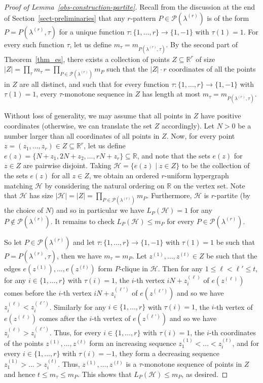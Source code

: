 \documentclass[10pt,a4paper]{amsart}
\theoremstyle{definition}
\newcommand{\su}{\subseteq}
\newcommand{\HH}{\mathcal{H}}
\newcommand{\PP}{\mathcal{P}}
\begin{document}
\begin{proof}[Proof of Lemma~\ref{obs-construction-partite}]
    Recall from the discussion at the end of Section~\ref{sect-preliminaries} that any $r$-pattern $P\in \PP(\lambda^{(r)})$ is of the form $P=P(\lambda^{(r)},\tau)$ for a unique function $\tau:\{1,\dots,r\}\to \{1,-1\}$ with $\tau(1)=1$. For every such function $\tau$, let us define $m_\tau=m_{P(\lambda^{(r)},\tau)}$. By the second part of Theorem~\ref{thm_es}, there exists a collection of points $Z\su \mathbb{R}^r$ of size $|Z|=\prod_{\tau} m_{\tau}=\prod_{P\in \PP(\lambda^{(r)})} m_{P}$ such that the $|Z|\cdot r$ coordinates of all the points in $Z$ are all distinct, and such that for every function $\tau:\{1,\dots,r\}\to \{1,-1\}$ with $\tau(1)=1$, every $\tau$-monotone sequence in $Z$ has length at most $m_\tau=m_{P(\lambda^{(r)},\tau)}$.
    
    Without loss of generality, we may assume that all points in $Z$ have positive coordinates (otherwise, we can translate the set $Z$ accordingly). Let $N>0$ be a number larger than all coordinates of all points in $Z$. Now, for every point $z=(z_1,\dots,z_r)\in Z\su \mathbb{R}^r$, let us define $e(z)=\{N+ z_1, 2N + z_2, \ldots, r N+z_r \}\su \mathbb{R}$, and note that the sets $e(z)$ for $z\in Z$ are pairwise disjoint. Taking $\HH=\{e(z)\mid z\in Z\}$ to be the collection of the sets $e(z)$ for all $z\in Z$, we obtain an ordered $r$-uniform hypergraph matching $\HH$ by considering the natural ordering on $\mathbb{R}$ on the vertex set. Note that $\HH$ has size $|\HH|=|Z|=\prod_{P\in \PP(\lambda^{(r)})} m_{P}$. Furthermore, $\HH$ is $r$-partite (by the choice of $N$) and so in particular we have $L_{P}(\HH)=1$ for any $P\not\in \PP(\lambda^{(r)})$. It remains to check $L_{P}(\HH)\le m_P$ for every $P\in \PP(\lambda^{(r)})$.

    So let $P\in \PP(\lambda^{(r)})$ and let $\tau:\{1,\dots,r\}\to \{1,-1\}$ with $\tau(1)=1$ be such that $P=P(\lambda^{(r)},\tau)$, then we have $m_\tau=m_P$. Let $z^{(1)},\dots,z^{(t)}\in Z$ be such that the edges $e(z^{(1)}),\dots,e(z^{(t)})$ form $P$-clique in $\HH$. Then for any $1\le \ell<\ell'\le t$, for any $i\in \{1,\dots,r\}$ with $\tau(i)=1$, the $i$-th vertex $iN+z^{(\ell)}_i$ of $e(z^{(\ell)})$ comes before the $i$-th vertex $iN+z^{(\ell')}_i$ of $e(z^{(\ell')})$ and so we have $z^{(\ell)}_i<z^{(\ell')}_i$. Similarly for any $i\in \{1,\dots,r\}$ with $\tau(i)=1$, the $i$-th vertex of $e(z^{(\ell)})$ comes after the $i$-th vertex of $e(z^{(\ell')})$ and so we have $z^{(\ell)}_i>z^{(\ell')}_i$. Thus, for every $i\in \{1,\dots,r\}$ with $\tau(i)=1$, the $i$-th coordinates of the points $z^{(1)},\dots,z^{(t)}$ form an increasing sequence 
    $z^{(1)}_1<\dots<z^{(t)}_i$, and for every $i\in \{1,\dots,r\}$ with $\tau(i)=-1$, they form a decreasing sequence $z^{(1)}_1>\dots>z^{(t)}_i$. Thus, $z^{(1)},\dots,z^{(t)}$ is a $\tau$-monotone sequence of points in $Z$ and hence $t\le m_\tau\le m_P$. This shows that $L_P(\HH)\le m_P$, as desired.
\end{proof}
\end{document}
